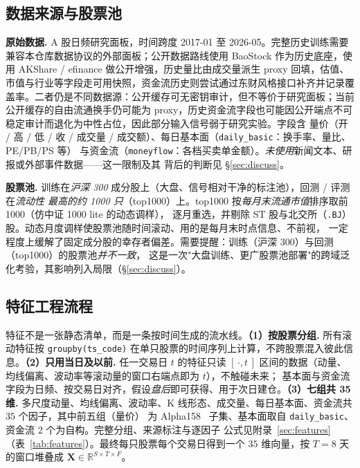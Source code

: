 \documentclass[a4paper,11pt,fontset=fandol]{ctexart}
\begin{document}
\subsection{数据来源与股票池}\label{sec:data-universe}
\textbf{\heiti 原始数据.} A 股日频研究面板，时间跨度 2017-01 至 2026-05。完整历史训练需要兼容本仓库数据协议的外部面板；公开数据路线使用 BaoStock 作为历史底座，使用 AKShare / efinance 做公开增强，历史量比由成交量派生 proxy 回填，估值、市值与行业等字段走可用快照，资金流历史则尝试通过东财风格接口补齐并记录覆盖率。二者仍是不同数据源：公开缓存可无密钥审计，但不等价于研究面板；当前公开缓存的自由流通换手仍可能为 proxy，历史资金流字段也可能因公开端点不可稳定审计而退化为中性占位，因此部分输入信号弱于研究实验。字段含
量价（开 / 高 / 低 / 收 / 成交量 / 成交额）、每日基本面（\texttt{daily\_basic}：换手率、量比、PE/PB/PS 等）
与资金流（\texttt{moneyflow}：各档买卖单金额）。\emph{未使用}新闻文本、研报或外部事件数据——这一限制及其
背后的判断见 §\ref{sec:discuss}。

\textbf{\heiti 股票池.} 训练在\emph{沪深 300} 成分股上（大盘、信号相对干净的标注池），回测 / 评测在\emph{流动性
最高的约 1000 只}（top1000）上。top1000 按\emph{每月末流通市值}排序取前 1000（仿中证 1000 lite 的动态调样），
逐月重选，并剔除 ST 股与北交所（\texttt{.BJ}）股。动态月度调样使股票池随时间滚动、用的是每月末时点信息、不前视，
一定程度上缓解了固定成分股的幸存者偏差。需要提醒：训练（沪深 300）与回测（top1000）的股票池\emph{并不一致}，
这是一次"大盘训练、更广股票池部署"的跨域泛化考验，其影响列入局限（§\ref{sec:discuss}）。

\subsection{特征工程流程}\label{sec:data-feat}
特征不是一张静态清单，而是一条按时间生成的流水线。\textbf{\heiti（1）按股票分组.} 所有滚动特征按
\texttt{groupby(ts\_code)} 在单只股票的时间序列上计算，不跨股票混入彼此信息。\textbf{\heiti（2）只用当日及以前.} 任一交易日
$t$ 的特征只读 $[\,\cdot,t\,]$ 区间的数据（动量、均线偏离、波动率等滚动量的窗口右端点即为 $t$），不触碰未来；
基本面与资金流字段为日频、按交易日对齐，假设\emph{盘后}即可获得、用于次日建仓。\textbf{\heiti（3）七组共
35 维.} 多尺度动量、均线偏离、波动率、K 线形态、成交量、每日基本面、资金流共 $35$ 个因子，其中前五组（量价）
为 Alpha158~\cite{qlib} 子集、基本面取自 \texttt{daily\_basic}、资金流 2 个为自构。完整分组、来源标注与逐因子
公式见附录~\ref{sec:features}（表~\ref{tab:features}）。最终每只股票每个交易日得到一个 $35$ 维向量，按 $T{=}8$
天的窗口堆叠成 $\bm{X}\in\mathbb{R}^{S\times T\times F}$。
\end{document}
